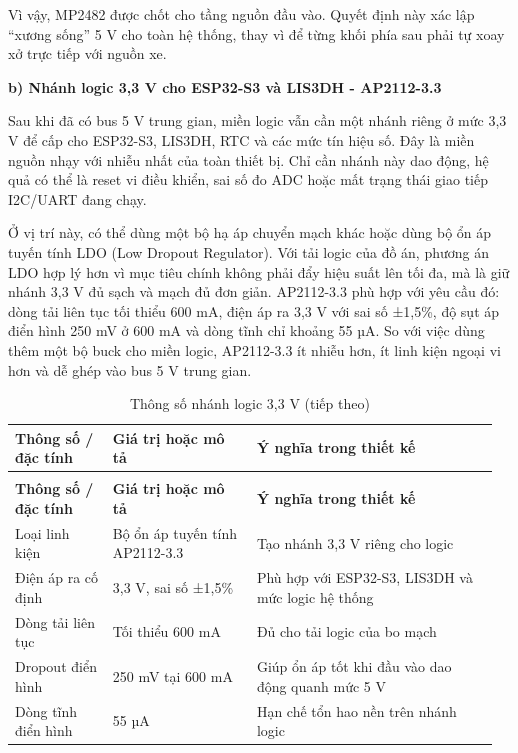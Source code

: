 \documentclass[a4paper]{extarticle}
\newcommand{\thesissettableid}[2]{%
  \renewcommand{\thetable}{#1}%
  \renewcommand{\theHtable}{#2}%
}
\begin{document}
Vì vậy, MP2482 được chốt cho tầng nguồn đầu vào. Quyết định này xác lập
``xương sống'' 5 V cho toàn hệ thống, thay vì để từng khối phía sau phải tự
xoay xở trực tiếp với nguồn xe.

\textbf{b) Nhánh logic 3,3 V cho ESP32-S3 và LIS3DH - AP2112-3.3}

Sau khi đã có bus 5 V trung gian, miền logic vẫn cần một nhánh riêng ở mức
3,3 V để cấp cho ESP32-S3, LIS3DH, RTC và các mức tín hiệu số. Đây là miền
nguồn nhạy với nhiễu nhất của toàn thiết bị. Chỉ cần nhánh này dao động,
hệ quả có thể là reset vi điều khiển, sai số đo ADC hoặc mất trạng thái
giao tiếp I2C/UART đang chạy.

Ở vị trí này, có thể dùng một bộ hạ áp chuyển mạch khác hoặc dùng bộ ổn áp
tuyến tính LDO (Low Dropout Regulator). Với tải logic của đồ án, phương án
LDO hợp lý hơn vì mục tiêu chính không phải đẩy hiệu suất lên tối đa, mà là
giữ nhánh 3,3 V đủ sạch và mạch đủ đơn giản. AP2112-3.3 phù hợp với yêu cầu
đó: dòng tải liên tục tối thiểu 600 mA, điện áp ra 3,3 V với sai số ±1,5\%,
độ sụt áp điển hình 250 mV ở 600 mA và dòng tĩnh chỉ khoảng 55 µA. So với
việc dùng thêm một bộ buck cho miền logic, AP2112-3.3 ít nhiễu hơn, ít linh
kiện ngoại vi hơn và dễ ghép vào bus 5 V trung gian.

{\thesissettableid{3.12B}{condensed-bang-3-12b-thong-so-nhanh-logic-3-3-v}
\def\LTcaptype{table}
\begin{longtable}{|L{0.195\linewidth}|L{0.284\linewidth}|L{0.479\linewidth}|}
\caption{Thông số nhánh logic 3,3 V}\label{tab:condensed-bang-3-12b-thong-so-nhanh-logic-3-3-v}\\
\hline
\textbf{Thông số / đặc tính} & \textbf{Giá trị hoặc mô tả} & \textbf{Ý nghĩa trong thiết kế} \\
\hline
\endfirsthead
\caption[]{Thông số nhánh logic 3,3 V (tiếp theo)}\\
\hline
\textbf{Thông số / đặc tính} & \textbf{Giá trị hoặc mô tả} & \textbf{Ý nghĩa trong thiết kế} \\
\hline
\endhead
\endfoot
\endlastfoot
Loại linh kiện & Bộ ổn áp tuyến tính AP2112-3.3 & Tạo nhánh 3,3 V riêng cho logic \\\hline
Điện áp ra cố định & 3,3 V, sai số ±1,5\% & Phù hợp với ESP32-S3, LIS3DH và mức logic hệ thống \\\hline
Dòng tải liên tục & Tối thiểu 600 mA & Đủ cho tải logic của bo mạch \\\hline
Dropout điển hình & 250 mV tại 600 mA & Giúp ổn áp tốt khi đầu vào dao động quanh mức 5 V \\\hline
Dòng tĩnh điển hình & 55 µA & Hạn chế tổn hao nền trên nhánh logic \\\hline
\end{longtable}
}
\end{document}
